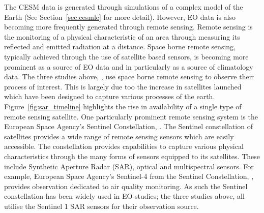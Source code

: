 The CESM data is generated through simulations of a complex model of the Earth (See Section~\ref{sec:cesmle} for more detail).
However, EO data is also becoming more frequently generated through remote sensing.
Remote sensing is the monitoring of a physical characteristic of an area through measuring its reflected and emitted radiation at a distance. 
Space borne remote sensing, typically achieved through the use of satellite based sensors, is becoming more prominent as a source of EO data and in particularly as a source of climatology data.
The three studies above, \citep{muro_short-term_2016, raspini_continuous_2018, khabbazan_crop_2019}, use space borne remote sensing to observe their process of interest. 
This is largely due too the increase in satellites launched which have been designed to capture various processes of the earth.
Figure~\ref{fig:sar_timeline} highlights the rise in availability of a single type of remote sensing satellite.
One particularly prominent remote sensing system is the European Space Agency's Sentinel Constellation, \cite{aschbacher_european_2012}.
The Sentinel constellation of satellites provides a wide range of remote sensing sensors which are easily accessible.
The constellation provides capabilities to capture various physical characteristics through the many forms of sensors equipped to its satellites.
These include  Synthetic Aperture Radar (SAR), optical and multispectral sensors.
For example, European Space Agency's Sentinel-4 from the Sentinel Constellation, \cite{aschbacher_european_2012}, provides observation dedicated to air quality monitoring.
As such the Sentinel constellation has been widely used in EO studies; the three studies above, \citep{muro_short-term_2016, khabbazan_crop_2019, raspini_continuous_2018}  all utilise the Sentinel 1 SAR sensors for their observation source. 

